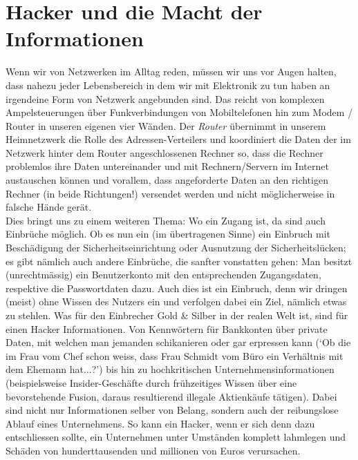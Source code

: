 \documentclass[b5paper,10pt,dvips,fleqn,titlepage,twoside]{book}
\begin{document}
\chapter{Hacker und die Macht der Informationen}
Wenn wir von Netzwerken im Alltag reden, müssen wir uns vor Augen halten, dass nahezu jeder Lebensbereich in dem wir mit Elektronik zu tun haben an irgendeine Form von Netzwerk angebunden sind. Das reicht von komplexen Ampelsteuerungen über Funkverbindungen von Mobiltelefonen hin zum Modem / Router in unseren eigenen vier Wänden. Der \emph{Router} übernimmt in unserem Heimnetzwerk die Rolle des Adressen-Verteilers und koordiniert die Daten der im Netzwerk hinter dem Router angeschlossenen Rechner so, dass die Rechner problemlos ihre Daten untereinander und mit Rechnern/Servern im Internet austauschen können und vorallem, dass angeforderte Daten an den richtigen Rechner (in beide Richtungen!) versendet werden und nicht möglicherweise in falsche Hände gerät.\\Dies bringt uns zu einem weiteren Thema: Wo ein Zugang ist, da sind auch Einbrüche möglich. 
Ob es nun ein (im übertragenen Sinne) ein Einbruch mit Beschädigung der Sicherheitseinrichtung oder Ausnutzung der Sicherheitslücken; es gibt nämlich auch andere Einbrüche, die sanfter vonstatten gehen: Man besitzt (unrechtmässig) ein Benutzerkonto mit den entsprechenden Zugangsdaten, respektive die Passwortdaten dazu. Auch dies ist ein Einbruch, denn wir dringen (meist) ohne Wissen des Nutzers ein und verfolgen dabei ein Ziel, nämlich etwas zu stehlen. Was für den Einbrecher Gold \& Silber in der realen Welt ist, sind für einen Hacker Informationen. Von Kennwörtern für Bankkonten über private Daten, mit welchen man jemanden schikanieren oder gar erpressen kann (`Ob die im Frau vom Chef schon weiss, dass Frau Schmidt vom Büro ein Verhältnis mit dem Ehemann hat...?') bis hin zu hochkritischen Unternehmensinformationen (beispielsweise Insider-Geschäfte durch frühzeitiges Wissen über eine bevorstehende Fusion, daraus resultierend illegale Aktienkäufe tätigen). Dabei sind nicht nur Informationen selber von Belang, sondern auch der reibungslose Ablauf eines Unternehmens. So kann ein Hacker, wenn er sich denn dazu entschliessen sollte, ein Unternehmen unter Umständen komplett lahmlegen und Schäden von hunderttausenden und millionen von Euros verursachen.\newline
\end{document}

